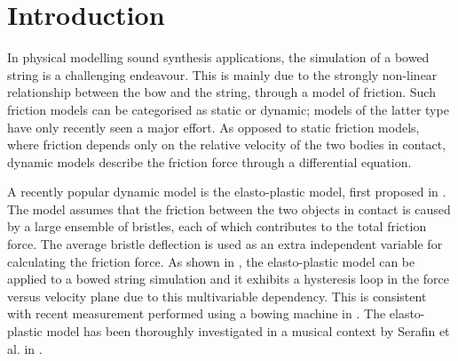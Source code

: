 \documentclass[twoside,a4paper,dvipsnames]{article}
\title{\papertitle}
\newif\ifpdf
\begin{document}
\ifpdf %
  \DeclareGraphicsExtensions{.png,.jpg,.pdf, .eps} 
\else  %
\fi

\maketitle
    
\begin{abstract}
The simulation of a bowed string is challenging due to the strongly non-linear relationship between the bow and the string. This relationship can be described through a model of friction. Several friction models in the literature have been proposed, from simple velocity dependent to more accurate ones. Similarly, a highly accurate technique to simulate a stiff string is the use of finite-difference time-domain (FDTD) methods. As these models are generally computationally heavy, implementation in real-time is challenging. This paper presents the combination of a complex friction model, namely the elasto-plastic friction model, and a stiff string simulated using FDTD methods. We show that it is possible to keep the CPU usage of a single bowed string below 5 percent. For real-time control of the bowed string, the Sensel Morph is used.
\end{abstract}
\section{Introduction}
\label{sec:intro}
In physical modelling sound synthesis applications, the simulation of a bowed string is a challenging endeavour. This is mainly due to the strongly non-linear relationship between the bow and the string, through a model of friction. Such friction models can be categorised as static or dynamic; models of the latter type have only recently seen a major effort. As opposed to static friction models, where friction depends only on the relative velocity of the two bodies in contact, dynamic models describe the friction force through a differential equation.

 A recently popular dynamic model is the elasto-plastic model, first proposed in \cite{Dupont2002}. The model assumes that the friction between the two objects in contact is caused by a large ensemble of bristles, each of which contributes to the total friction force. The average bristle deflection is used as an extra independent variable for calculating the friction force. As shown in \cite{Serafin2003}, the elasto-plastic model can be applied to a bowed string simulation and it exhibits a hysteresis loop in the force versus velocity plane due to this multivariable dependency.
 This is consistent with recent measurement performed using a bowing machine in \cite{Woodhouse2003}.
 The elasto-plastic model has been thoroughly investigated in a musical context by Serafin et al. in \cite{Serafin2003, Serafin2004, Avanzini2005}. 
\end{document}

